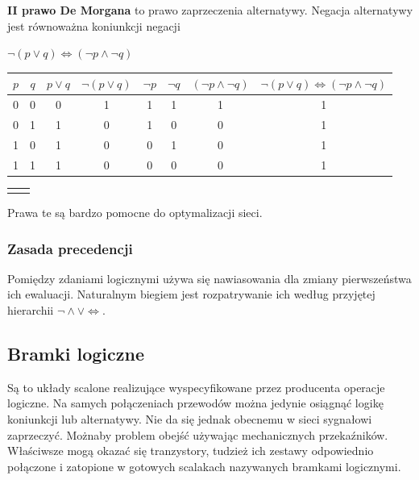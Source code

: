 \documentclass[a4paper,12pt]{article}
\begin{document}
\textbf{II prawo De Morgana} to prawo zaprzeczenia alternatywy. Negacja alternatywy jest równoważna koniunkcji negacji


$\lnot (p \lor q) \iff (\lnot p \land \lnot q)$

\begin{table}[h!]
\centering

\begin{minipage}{15cm}
\centering

\begin{tabular}{ | c | c || c | c || c | c | c || c | }
  \hline
  $p$ & $q$ & $p \lor q$ & $\lnot (p \lor q)$ & $\lnot p$ & $\lnot q$ & $(\lnot p \land \lnot q)$ & $\lnot (p \lor q) \iff (\lnot p \land \lnot q)$ \\ \hline
  0 & 0 & 0 & 1 & 1 & 1 & 1 & 1 \\
  0 & 1 & 1 & 0 & 1 & 0 & 0 & 1 \\
  1 & 0 & 1 & 0 & 0 & 1 & 0 & 1 \\
  1 & 1 & 1 & 0 & 0 & 0 & 0 & 1 \\
  \hline
\end{tabular}

\end{minipage}
\begin{minipage}{0.5cm}
\begin{tabular}{  c r }
  & \\
\end{tabular}
\end{minipage}
\end{table}


Prawa te są bardzo pomocne do optymalizacji sieci.


\subsubsection{Zasada precedencji}
Pomiędzy zdaniami logicznymi używa się nawiasowania dla zmiany pierwszeństwa ich ewaluacji. Naturalnym biegiem jest rozpatrywanie ich według przyjętej hierarchii $\lnot \land \lor \iff$.

\subsection{Bramki logiczne}
Są to układy scalone realizujące wyspecyfikowane przez producenta operacje logiczne. Na samych połączeniach przewodów można jedynie osiągnąć logikę koniunkcji lub alternatywy. Nie da się jednak obecnemu w sieci sygnałowi zaprzeczyć. Możnaby problem obejść używając mechanicznych przekaźników. Właściwsze mogą okazać się tranzystory, tudzież ich zestawy odpowiednio połączone i zatopione w gotowych scalakach nazywanych bramkami logicznymi.
\end{document}
